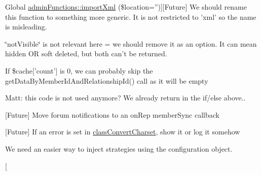 \begin{DoxyRefList}
Global \hyperlink{classadmin_functions_a235c2e270a15609af4bda7136f59a7cd}{admin\-Functions\-:\-:import\-Xml} (\$location='')]\mbox{[}Future\mbox{]} We should rename this function to something more generic. It is not restricted to 'xml' so the name is misleading.  
\item[\label{todo__todo000007}%
\hypertarget{todo__todo000007}{}%
Global \hyperlink{classclass__forums_a6ae8a55543326ca70699b730c1d178ea}{class\-\_\-forums\-:\-:fetch\-Post\-Hidden\-Flag} (\$type)]\char`\"{}not\-Visible\char`\"{} is not relevant here = we should remove it as an option. It can mean hidden O\-R soft deleted, but both can't be returned.  
\item[\label{todo__todo000021}%
\hypertarget{todo__todo000021}{}%
Global \hyperlink{classclasses__like__composite_a73d85c4bf0ce87a94c0d6088e00847b4}{classes\-\_\-like\-\_\-composite\-:\-:render} (\$view, \$rel\-Id, \$opts=array(), \$member\-Id=null)]If \$cache\mbox{[}'count'\mbox{]} is 0, we can probably skip the get\-Data\-By\-Member\-Id\-And\-Relationship\-Id() call as it will be empty  
\item[\label{todo__todo000020}%
\hypertarget{todo__todo000020}{}%
Global \hyperlink{classclass_item_marking_a0e4de985c3245d640fbb599b40d84adb}{class\-Item\-Marking\-:\-:\-\_\-find\-Main\-Row\-By\-Key} (\$data, \$app)]Matt\-: this code is not used anymore? We already return in the if/else above..  
\item[\label{todo__todo000018}%
\hypertarget{todo__todo000018}{}%
Global \hyperlink{classclass_reputation_cache_a49009e43061b8627cf8c8ec6950b4938}{class\-Reputation\-Cache\-:\-:add\-Rate} (\$type, \$type\-\_\-id, \$rating, \$message='', \$member\-\_\-id=0, \$app='')]\mbox{[}Future\mbox{]} Move forum notifications to an on\-Rep member\-Sync callback  
\item[\label{todo__todo000028}%
\hypertarget{todo__todo000028}{}%
Global \hyperlink{classclass_x_m_l_a63ced71f80d9c600996c6775f7a54ca6}{class\-X\-M\-L\-:\-:\-\_\-convert\-Charsets} (\$text, \$original\-\_\-cset, \$destination\-\_\-cset=\char`\"{}\-U\-T\-F-\/8\char`\"{})]\mbox{[}Future\mbox{]} If an error is set in \hyperlink{classclass_convert_charset}{class\-Convert\-Charset}, show it or log it somehow  
\item[\label{todo__todo000061}%
\hypertarget{todo__todo000061}{}%
Class \hyperlink{class_h_t_m_l_purifier}{H\-T\-M\-L\-Purifier} ]We need an easier way to inject strategies using the configuration object.  
\item[\label{todo__todo000030}%
\hypertarget{todo__todo000030}{}%

\end{DoxyRefList}
